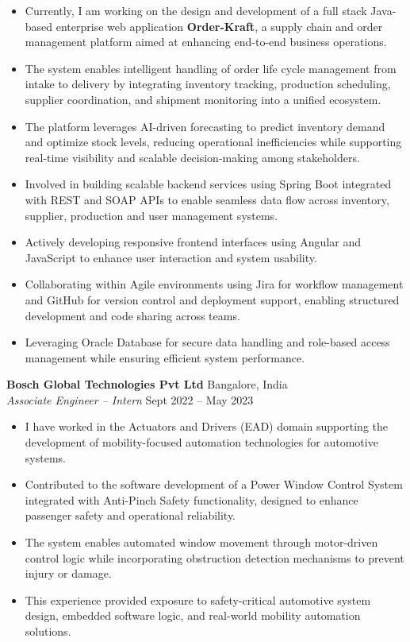 \documentclass[a4paper,10pt]{article}
\begin{document}
\begin{itemize}[leftmargin=*]
\item Currently, I am working on the design and development of a full stack Java-based enterprise web application \textbf{Order-Kraft}, a supply chain and order management platform aimed at enhancing end-to-end business operations. 
\item The system enables intelligent handling of order life cycle management from intake to delivery by integrating inventory tracking, production scheduling, supplier coordination, and shipment monitoring into a unified ecosystem. 
\item The platform leverages AI-driven forecasting to predict inventory demand and optimize stock levels, reducing operational inefficiencies while supporting real-time visibility and scalable decision-making among stakeholders.
\item Involved in building scalable backend services using Spring Boot integrated with REST and SOAP APIs to enable seamless data flow across inventory, supplier, production and user management systems.
\item Actively developing responsive frontend interfaces using Angular and JavaScript to enhance user interaction and system usability.
\item Collaborating within Agile environments using Jira for workflow management and GitHub for version control and deployment support, enabling structured development and code sharing across teams.
\item Leveraging Oracle Database for secure data handling and role-based access management while ensuring efficient system performance.
\end{itemize}
\vspace{2mm}



\textbf{Bosch Global Technologies Pvt Ltd} \hfill Bangalore, India \\
\textit{Associate Engineer – Intern} \hfill Sept 2022 – May 2023
\vspace{2mm}

\begin{itemize}[leftmargin=*]
\item I have worked in the Actuators and Drivers (EAD) domain supporting the development of mobility-focused automation technologies for automotive systems. 
\item Contributed to the software development of a Power Window Control System integrated with Anti-Pinch Safety functionality, designed to enhance passenger safety and operational reliability.
\item The system enables automated window movement through motor-driven control logic while incorporating obstruction detection mechanisms to prevent injury or damage. 
\item This experience provided exposure to safety-critical automotive system design, embedded software logic, and real-world mobility automation solutions.
\end{itemize}
\end{document}
